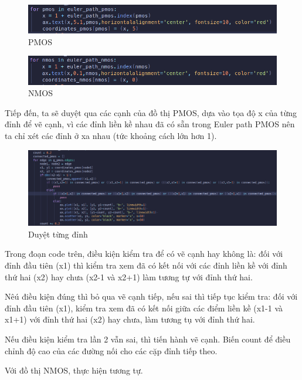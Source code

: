 \documentclass[a4paper,12pt]{article}
\begin{document}
\begin{figure}
    \centering
    \includegraphics[width=1\textwidth]{../PNG/pmos.png}
    \caption{PMOS}
    \label{fig:pmos}
\end{figure}

\begin{figure}
    \centering
    \includegraphics[width=1\textwidth]{../PNG/nmos.png}
    \caption{NMOS}
    \label{fig:nmos}
\end{figure}
\newpage
Tiếp đến, ta sẽ duyệt qua các cạnh của đồ thị PMOS, dựa vào tọa độ x của từng đỉnh
để vẽ cạnh, vì các đỉnh liền kề nhau đã có sẵn trong Euler path PMOS nên ta chỉ 
xét các đỉnh ở xa nhau (tức khoảng cách lớn hơn 1).

\begin{figure}
    \centering
    \includegraphics[width=1\textwidth]{../PNG/hehe.png}
    \caption{Duyệt từng đỉnh}
    \label{fig:hehe}
\end{figure}

Trong đoạn code trên, điều kiện kiểm tra để có vẽ cạnh hay không là: đối với đỉnh đầu tiên (x1) thì kiểm tra 
xem đã có kết nối với các đỉnh liền kề với đỉnh thứ hai (x2) hay chưa (x2-1 và x2+1) làm tương tự với đỉnh thứ hai.

Nêú điều kiện đúng thì bỏ qua vẽ cạnh tiếp, nếu sai thì tiếp tục kiểm tra:
đối với đỉnh đầu tiên (x1), kiểm tra xem đã có kết nối giữa các điểm liền kề (x1-1 và x1+1) 
với đỉnh thứ hai (x2) hay chưa, làm tương tụ với đỉnh thứ hai.

Nếu điều kiện kiểm tra lần 2 vẫn sai, thì tiến hành vẽ cạnh. Biến count để điều chỉnh độ cao của các đường nối cho các cặp đỉnh tiếp theo.

Với đồ thị NMOS, thực hiện tương tự.
\end{document}
